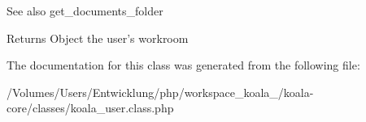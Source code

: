\begin{DoxySeeAlso}{See also}
get\_\-documents\_\-folder
\end{DoxySeeAlso}
\begin{DoxyReturn}{Returns}
Object the user's workroom 
\end{DoxyReturn}


The documentation for this class was generated from the following file:\begin{DoxyCompactItemize}
\item 
/Volumes/Users/Entwicklung/php/workspace\_\-koala\_/koala-\/core/classes/koala\_\-user.class.php\end{DoxyCompactItemize}
